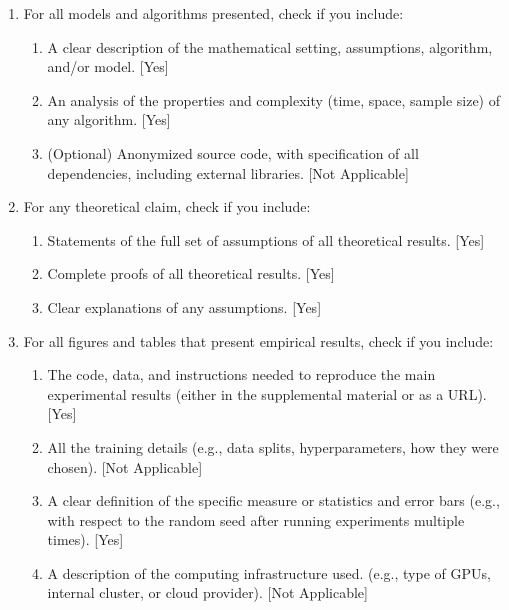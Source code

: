 \documentclass[twoside]{article}
\begin{document}
 \begin{enumerate}


 \item For all models and algorithms presented, check if you include:
 \begin{enumerate}
   \item A clear description of the mathematical setting, assumptions, algorithm, and/or model. [Yes]
   \item An analysis of the properties and complexity (time, space, sample size) of any algorithm. [Yes]
   \item (Optional) Anonymized source code, with specification of all dependencies, including external libraries. [Not Applicable]
 \end{enumerate}


 \item For any theoretical claim, check if you include:
 \begin{enumerate}
   \item Statements of the full set of assumptions of all theoretical results. [Yes]
   \item Complete proofs of all theoretical results. [Yes]
   \item Clear explanations of any assumptions. [Yes]     
 \end{enumerate}


 \item For all figures and tables that present empirical results, check if you include:
 \begin{enumerate}
   \item The code, data, and instructions needed to reproduce the main experimental results (either in the supplemental material or as a URL). [Yes]
   \item All the training details (e.g., data splits, hyperparameters, how they were chosen). [Not Applicable]
         \item A clear definition of the specific measure or statistics and error bars (e.g., with respect to the random seed after running experiments multiple times). [Yes]
         \item A description of the computing infrastructure used. (e.g., type of GPUs, internal cluster, or cloud provider). [Not Applicable]
 \end{enumerate}


\end{enumerate}
\end{document}
